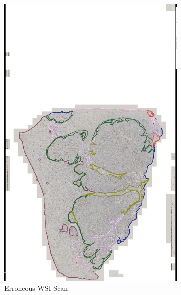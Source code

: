 \begin{figure}[h!t]
    \begin{subfigure}[b]{0.62\textwidth}
      \includegraphics[width=\textwidth]{latex/QuPathScreenshots/shitty_scan_cropped.png}
      \caption{Erroneous WSI Scan}
      \label{fig:ScanningIssue}
    \end{subfigure}
    \hfill  %
    \begin{subfigure}[b]{0.36\textwidth}
      \begin{subfigure}[t]{\textwidth}

\end{subfigure}
\end{subfigure}
\end{figure}
